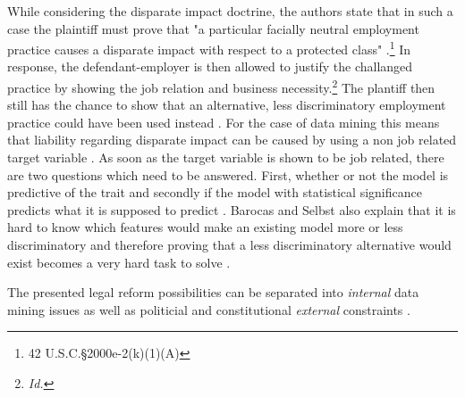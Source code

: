 While considering the disparate impact doctrine, the authors state that in such a case 
the plaintiff must prove that "a particular facially neutral employment practice causes 
a disparate impact with respect to a protected class" \cite{Barocas.2016} 
\cite{titleVII}.\footnote{ 42 U.S.C.§2000e-2(k)(1)(A) } In response, the defendant-employer 
is then allowed to justify the challanged practice by showing the job relation and 
business necessity.\footnote{ \textit{Id.} } The plantiff then still has the chance 
to show that an alternative, less discriminatory employment practice could have been 
used instead \cite{Barocas.2016}. For the case of data mining this means that liability 
regarding disparate impact can be caused by using a non job related target variable 
\cite{Barocas.2016}. As soon as the target variable is shown to be job related, there 
are two questions which need to be answered. First, whether or not the model is 
predictive of the trait and secondly if the model with statistical significance 
predicts what it is supposed to predict \cite{Barocas.2016}. Barocas and Selbst 
also explain that it is hard to know which features would make an existing model more 
or less discriminatory and therefore proving that a less discriminatory alternative 
would exist becomes a very hard task to solve \cite{Barocas.2016}.

The presented legal reform possibilities can be separated into \textit{internal} data 
mining issues as well as politicial and constitutional \textit{external} constraints 
\cite{Barocas.2016}. 